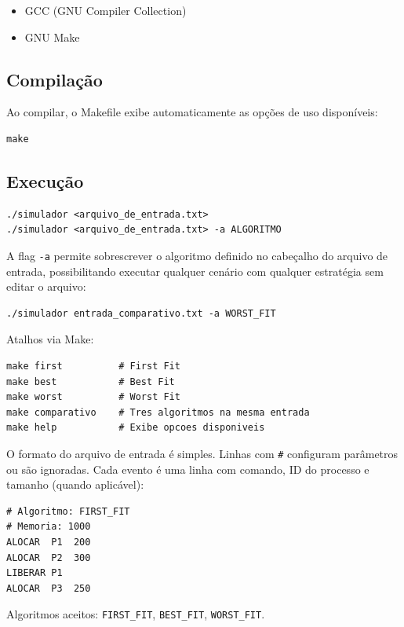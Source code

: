 \documentclass[12pt]{article}
\begin{document}
\begin{itemize}
    \item GCC (GNU Compiler Collection)
    \item GNU Make
\end{itemize}

\subsection{Compilação}

Ao compilar, o Makefile exibe automaticamente as opções de uso disponíveis:

\begin{lstlisting}
make
\end{lstlisting}

\subsection{Execução}

\begin{lstlisting}
./simulador <arquivo_de_entrada.txt>
./simulador <arquivo_de_entrada.txt> -a ALGORITMO
\end{lstlisting}

A flag \texttt{-a} permite sobrescrever o algoritmo definido no cabeçalho do arquivo de entrada, possibilitando executar qualquer cenário com qualquer estratégia sem editar o arquivo:

\begin{lstlisting}
./simulador entrada_comparativo.txt -a WORST_FIT
\end{lstlisting}

Atalhos via Make:

\begin{lstlisting}
make first          # First Fit
make best           # Best Fit
make worst          # Worst Fit
make comparativo    # Tres algoritmos na mesma entrada
make help           # Exibe opcoes disponiveis
\end{lstlisting}

O formato do arquivo de entrada é simples. Linhas com \texttt{\#} configuram parâmetros ou são ignoradas. Cada evento é uma linha com comando, ID do processo e tamanho (quando aplicável):

\begin{lstlisting}
# Algoritmo: FIRST_FIT
# Memoria: 1000
ALOCAR  P1  200
ALOCAR  P2  300
LIBERAR P1
ALOCAR  P3  250
\end{lstlisting}

Algoritmos aceitos: \texttt{FIRST\_FIT}, \texttt{BEST\_FIT}, \texttt{WORST\_FIT}.
\end{document}
